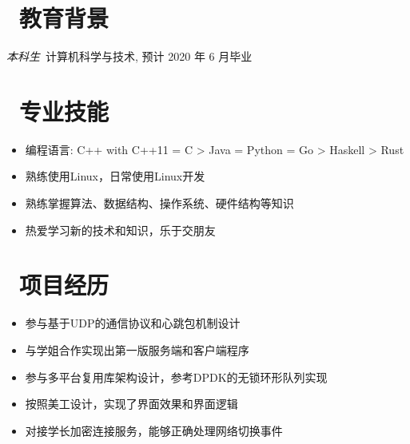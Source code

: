 \documentclass{resume}
\begin{document}



\section{\texorpdfstring{\faGraduationCap\ 教育背景}{教育背景}}
\textit{本科生}\ 计算机科学与技术, 预计 2020 年 6 月毕业

\section{\texorpdfstring{\faCogs\ 专业技能}{专业技能}}
\begin{itemize}[parsep=0.5ex]
  \item 编程语言: C++ with C++11 = C > Java = Python = Go > Haskell > Rust
  \item 熟练使用Linux，日常使用Linux开发
  \item 熟练掌握算法、数据结构、操作系统、硬件结构等知识
  \item 热爱学习新的技术和知识，乐于交朋友
\end{itemize}

\section{\texorpdfstring{\faUsers\ 项目经历}{项目经历}}
\begin{itemize}
  \item 参与基于UDP的通信协议和心跳包机制设计
  \item 与学姐合作实现出第一版服务端和客户端程序
  \item 参与多平台复用库架构设计，参考DPDK的无锁环形队列实现
\end{itemize}

\begin{itemize}
  \item 按照美工设计，实现了界面效果和界面逻辑
  \item 对接学长加密连接服务，能够正确处理网络切换事件
\end{itemize}
\end{document}
